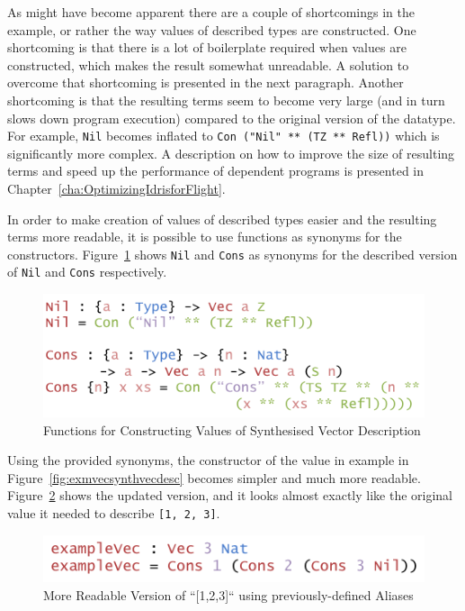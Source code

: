 \documentclass{ituthesis}
\newcommand{\ttconstructor}[1]{\textcolor{constructor-color}{\texttt{#1}}}
\newcommand{\ttdec}[1]{\textcolor{declared-var-color}{\texttt{#1}}}
\newcommand{\ttliteral}[1]{\textcolor{literal-color}{\texttt{#1}}}
\begin{document}
As might have become apparent there are a couple of shortcomings in the example, or rather the way values of described types are constructed.
One shortcoming is that there is a lot of boilerplate required when values are constructed, which makes the result somewhat unreadable.
A solution to overcome that shortcoming is presented in the next paragraph. Another shortcoming is that the resulting terms seem to become very large (and in turn slows down program execution) compared to the original
version of the datatype. For example, \ttconstructor{Nil} becomes inflated to \ttconstructor{Con~(}\ttliteral{"Nil"}~\ttconstructor{** (TZ ** Refl))} which is significantly more complex. A description on how to improve the size of resulting terms and
speed up the performance of dependent programs is presented in Chapter~\ref{cha:OptimizingIdrisforFlight}.

In order to make creation of values of described types easier and the resulting terms more readable, it is possible to use functions as synonyms for the constructors.
Figure~\ref{fig:funcconstrsynthvec} shows \ttdec{Nil} and \ttdec{Cons} as synonyms for the described version of \ttconstructor{Nil} and \ttconstructor{Cons} respectively.

\begin{figure}[ht]
\begin{center}
    \includegraphics[scale=0.5]{Figures/VectorSynthesisedConstructors.png}
\end{center}
\caption{Functions for Constructing Values of Synthesised Vector Description}
\label{fig:funcconstrsynthvec}
\end{figure}

Using the provided synonyms, the constructor of the value in example in Figure~\ref{fig:exmvecsynthvecdesc} becomes simpler and much more readable. Figure~\ref{fig:exmvecsynthvecdescconstrs} shows the updated version,
and it looks almost exactly like the original value it needed to describe \ttliteral{[1, 2, 3]}.


\begin{figure}[ht]
\begin{center}
    \includegraphics[scale=0.5]{Figures/VectorSynthesisedConstructorsExample.png}
\end{center}
\caption{More Readable Version of ``[1,2,3]`` using previously-defined Aliases}
\label{fig:exmvecsynthvecdescconstrs}
\end{figure}
\end{document}
